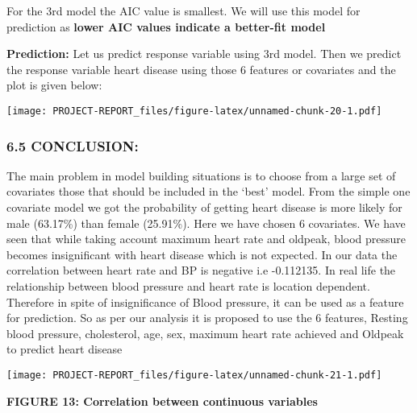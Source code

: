 \documentclass[
]{article}
\begin{document}
For the 3rd model the AIC value is smallest. We will use this model for
prediction as \textbf{lower AIC values indicate a better-fit model}

\textbf{Prediction:} Let us predict response variable using 3rd model.
Then we predict the response variable heart disease using those 6
features or covariates and the plot is given below:

\texttt{[image: PROJECT-REPORT\_files/figure-latex/unnamed-chunk-20-1.pdf]}

\hypertarget{conclusion}{%
\subsubsection{6.5 CONCLUSION:}\label{conclusion}}

The main problem in model building situations is to choose from a large
set of covariates those that should be included in the `best' model.
From the simple one covariate model we got the probability of getting
heart disease is more likely for male (63.17\%) than female (25.91\%).
Here we have chosen 6 covariates. We have seen that while taking account
maximum heart rate and oldpeak, blood pressure becomes insignificant
with heart disease which is not expected. In our data the correlation
between heart rate and BP is negative i.e -0.112135. In real life the
relationship between blood pressure and heart rate is location
dependent. Therefore in spite of insignificance of Blood pressure, it
can be used as a feature for prediction. So as per our analysis it is
proposed to use the 6 features, Resting blood pressure, cholesterol,
age, sex, maximum heart rate achieved and Oldpeak to predict heart
disease

\texttt{[image: PROJECT-REPORT\_files/figure-latex/unnamed-chunk-21-1.pdf]}

\textbf{FIGURE 13: Correlation between continuous variables}
\end{document}

